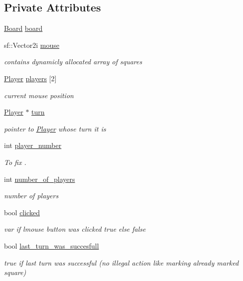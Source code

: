\subsection*{Private Attributes}
\begin{DoxyCompactItemize}
\item 
\hyperlink{class_board}{Board} \hyperlink{class_engine_aab263540a0e814e6304a3ef6b751b097}{board}
\item 
sf\+::\+Vector2i \hyperlink{class_engine_a6da5d0a63da9f898192b2030b754065f}{mouse}
\begin{DoxyCompactList}\small\item\em contains dynamicly allocated array of squares \end{DoxyCompactList}\item 
\hyperlink{class_player}{Player} \hyperlink{class_engine_a2fd7bb89b1be2ea2a33e90e4d0699ffc}{players} \mbox{[}2\mbox{]}
\begin{DoxyCompactList}\small\item\em current mouse position \end{DoxyCompactList}\item 
\hyperlink{class_player}{Player} $\ast$ \hyperlink{class_engine_a747d5223870d541667213e307cc34d04}{turn}
\begin{DoxyCompactList}\small\item\em pointer to \hyperlink{class_player}{Player} whose turn it is \end{DoxyCompactList}\item 
int \hyperlink{class_engine_a663054b19f734fa167305abf546d8151}{player\+\_\+number}
\begin{DoxyCompactList}\small\item\em To fix . \end{DoxyCompactList}\item 
int \hyperlink{class_engine_a7c9d0480379dfdf9eafaf3344d076e4d}{number\+\_\+of\+\_\+players}
\begin{DoxyCompactList}\small\item\em number of players \end{DoxyCompactList}\item 
bool \hyperlink{class_engine_a9c9336f739cd336a1346a17504857a45}{clicked}
\begin{DoxyCompactList}\small\item\em var if lmouse button was clicked true else false \end{DoxyCompactList}\item 
bool \hyperlink{class_engine_a7dbc1e409179b77add60013155b684a0}{last\+\_\+turn\+\_\+was\+\_\+succesfull}
\begin{DoxyCompactList}\small\item\em true if last turn was successful (no illegal action like marking already marked square) \end{DoxyCompactList}\end{DoxyCompactItemize}



